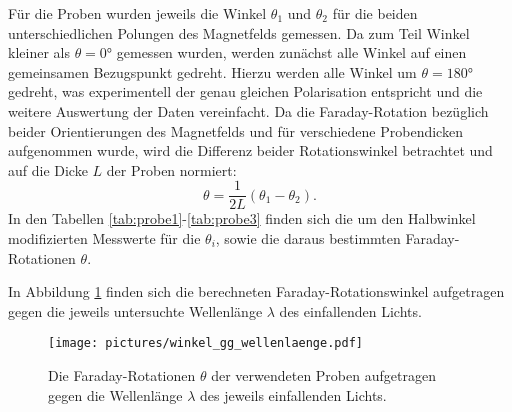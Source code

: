 Für die Proben wurden jeweils die Winkel $\theta_1$ und $\theta_2$ für die beiden unterschiedlichen Polungen des Magnetfelds gemessen. Da zum Teil Winkel kleiner als $\theta=\ang{0}$ gemessen wurden, werden zunächst  alle Winkel auf einen gemeinsamen Bezugspunkt gedreht. Hierzu werden alle Winkel um $\theta=\ang{180}$ gedreht, was experimentell der genau gleichen Polarisation entspricht und die weitere Auswertung der Daten vereinfacht.
Da die Faraday-Rotation bezüglich beider Orientierungen des Magnetfelds und für verschiedene Probendicken aufgenommen wurde, wird die Differenz beider Rotationswinkel betrachtet und auf die Dicke $L$ der Proben normiert:
\begin{equation}
  \theta=\frac{1}{2L}\left(\theta_1-\theta_2\right)\mathrm{.}
\end{equation}
In den Tabellen \ref{tab:probe1}-\ref{tab:probe3} finden sich die um den Halbwinkel modifizierten Messwerte für die $\theta_i$, sowie die daraus bestimmten Faraday-Rotationen $\theta$.




In Abbildung \ref{fig:faraday} finden sich die berechneten Faraday-Rotationswinkel aufgetragen gegen die jeweils untersuchte Wellenlänge $\lambda$ des einfallenden Lichts.

\begin{figure}
  \centering
  \texttt{[image: pictures/winkel\_gg\_wellenlaenge.pdf]}
  \caption{Die Faraday-Rotationen $\theta$ der verwendeten Proben aufgetragen gegen die Wellenlänge $\lambda$ des jeweils einfallenden Lichts.}
  \label{fig:faraday}
\end{figure}
\FloatBarrier
